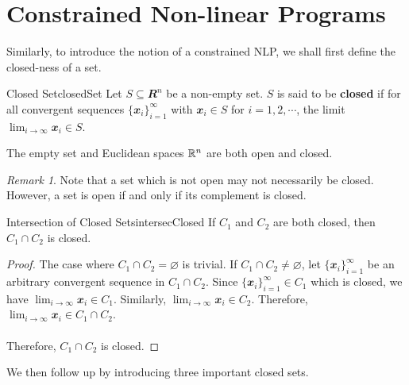\documentclass[math, code]{amznotes}
\theoremstyle{remark}
\newtheorem*{remark}{Remark}
\begin{document}
\section{Constrained Non-linear Programs}
Similarly, to introduce the notion of a constrained NLP, we shall first define the closed-ness of a set.
\begin{dfnbox}{Closed Set}{closedSet}
    Let $S \subseteq \mathbfit{R}^n$ be a non-empty set. $S$ is said to be {\color{red} \textbf{closed}} if for all convergent sequences $\{\mathbfit{x}_i\}_{i = 1}^{\infty}$ with $\mathbfit{x}_i \in S$ for $i = 1, 2, \cdots$, the limit $\lim_{i \to \infty} \mathbfit{x}_i \in S$.
\end{dfnbox}
The empty set and Euclidean spaces $\mathbb{R}^n$ are both open and closed.
\begin{notebox}
    \begin{remark}
        Note that a set which is not open may not necessarily be closed. However, a set is open if and only if its complement is closed.
    \end{remark}
\end{notebox}
\begin{thmbox}{Intersection of Closed Sets}{intersecClosed}
    If $C_1$ and $C_2$ are both closed, then $C_1 \cap C_2$ is closed.
    \tcblower
    \begin{proof}
        The case where $C_1 \cap C_2 = \varnothing$ is trivial. If $C_1 \cap C_2 \neq \varnothing$, let $\{\mathbfit{x}_i\}_{i = 1}^{\infty}$ be an arbitrary convergent sequence in $C_1 \cap C_2$. Since $\{\mathbfit{x}_i\}_{i = 1}^{\infty} \in C_1$ which is closed, we have $\lim_{i \to \infty} \mathbfit{x}_i \in C_1$. Similarly, $\lim_{i \to \infty} \mathbfit{x}_i \in C_2$. Therefore, $\lim_{i \to \infty} \mathbfit{x}_i \in C_1 \cap C_2$.
        \\\\
        Therefore, $C_1 \cap C_2$ is closed.
    \end{proof}
\end{thmbox}
We then follow up by introducing three important closed sets.
\end{document}
